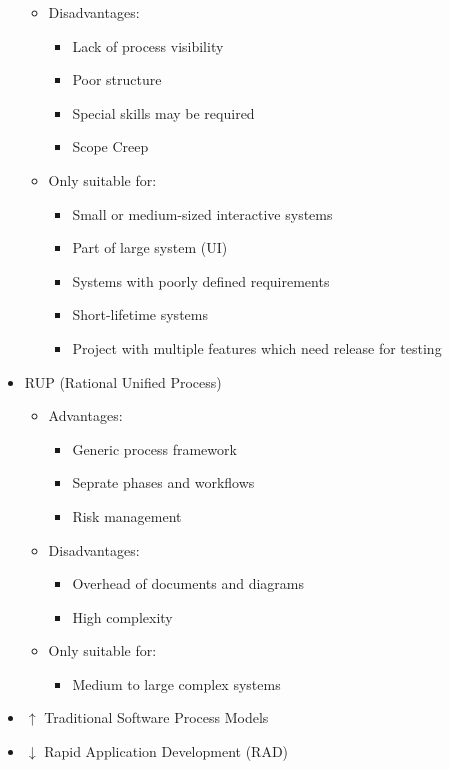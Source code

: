 \documentclass[12pt,openany]{book}
\begin{document}
\begin{itemize}
\begin{itemize}
\begin{itemize}
        \end{itemize}
        \item Disadvantages:
        \begin{itemize}
            \item Lack of process visibility
            \item Poor structure
            \item Special skills may be required
            \item Scope Creep
        \end{itemize}
        \item Only suitable for:
        \begin{itemize}
            \item Small or medium-sized interactive systems
            \item Part of large system (UI)
            \item Systems with poorly defined requirements
            \item Short-lifetime systems
            \item Project with multiple features which need release for testing
        \end{itemize}
    \end{itemize}
    \item RUP (Rational Unified Process)
    \begin{itemize}
        \item Advantages:
        \begin{itemize}
            \item Generic process framework
            \item Seprate phases and workflows
            \item Risk management
        \end{itemize}
        \item Disadvantages:
        \begin{itemize}
            \item Overhead of documents and diagrams
            \item High complexity
        \end{itemize}
        \item Only suitable for:
        \begin{itemize}
            \item Medium to large complex systems
        \end{itemize}
    \end{itemize}
    \item $\uparrow$ Traditional Software Process Models
    \item $\downarrow$ Rapid Application Development (RAD)
\end{itemize}
\end{document}
